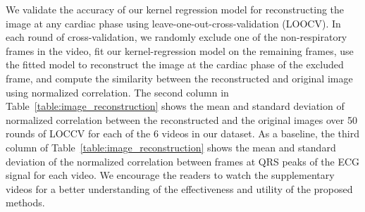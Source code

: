 \documentclass[runningheads,a4paper]{llncs}
\begin{document}
	We validate the accuracy of our kernel regression model for reconstructing the image at any cardiac phase using leave-one-out-cross-validation (LOOCV). In each round of cross-validation, we randomly exclude one of the non-respiratory frames in the video, fit our kernel-regression model on the remaining frames, use the fitted model to reconstruct the image at the cardiac phase of the excluded frame, and compute the similarity between the reconstructed and original image using normalized correlation. The second column in Table~\ref{table:image_reconstruction} shows the mean and standard deviation of normalized correlation between the reconstructed and the original images over 50 rounds of LOCCV for each of the 6 videos in our dataset. As a baseline, the third column of  Table~\ref{table:image_reconstruction} shows the mean and standard deviation of the normalized correlation between frames at QRS peaks of the ECG signal for each video. We encourage the readers to watch the supplementary videos for a better understanding of the effectiveness and utility of the proposed methods.
%
%
\end{document}
